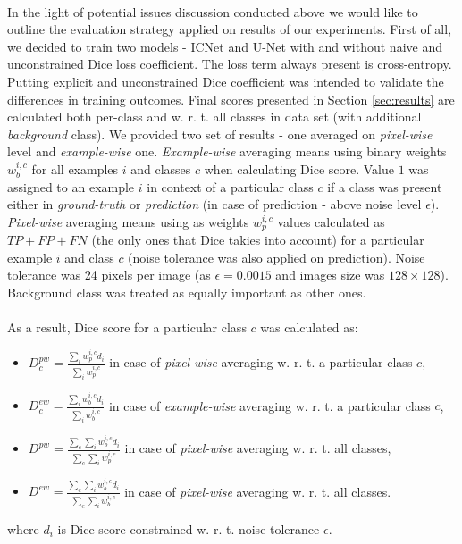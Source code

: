 \documentclass{article}
\begin{document}
\paragraph{}
In the light of potential issues discussion conducted above we would like to outline the evaluation strategy applied on results of our experiments. First of all, we decided to train two models - ICNet \cite{icnet} and U-Net \cite{unet} with and without naive and unconstrained Dice loss coefficient. The loss term always present is cross-entropy. Putting explicit and unconstrained Dice coefficient was intended to validate the differences in training outcomes. Final scores presented in Section \ref{sec:results} are calculated both per-class and w. r. t. all classes in data set (with additional \textit{background} class). We provided two set of results - one averaged on \textit{pixel-wise} level and \textit{example-wise} one. \textit{Example-wise} averaging means using binary weights $w_b^{i, c}$ for all examples $i$ and classes $c$ when calculating Dice score. Value $1$ was assigned to an example $i$ in context of a particular class $c$ if a class was present either in \textit{ground-truth} or \textit{prediction} (in case of prediction - above noise level $\epsilon$). \textit{Pixel-wise} averaging means using as weights $w_p^{i, c}$ values calculated as $TP + FP + FN$ (the only ones that Dice takies into account) for a particular example $i$ and class $c$ (noise tolerance was also applied on prediction). Noise tolerance was 24 pixels per image (as $\epsilon = 0.0015$ and images size was $128 \times 128$). Background class was treated as equally important as other ones.
\paragraph{}
As a result, Dice score for a particular class $c$ was calculated as:
\begin{itemize}
    \item $D^{pw}_{c} = \frac{\sum_i w_p^{i, c}d_i}{\sum_i w_p^{i, c}}$ in case of \textit{pixel-wise} averaging w. r. t. a particular class $c$,
    \item $D^{ew}_{c} = \frac{\sum_i w_b^{i, c}d_i}{\sum_i w_b^{i, c}}$ in case of \textit{example-wise} averaging w. r. t. a particular class $c$,
    \item $D^{pw} = \frac{\sum_{c}\sum_i w_p^{i, c}d_i}{\sum_{c}\sum_i w_p^{i, c}}$ in case of \textit{pixel-wise} averaging w. r. t. all classes,
    \item $D^{ew} = \frac{\sum_{c}\sum_i w_b^{i, c}d_i}{\sum_{c}\sum_i w_b^{i, c}}$ in case of \textit{pixel-wise} averaging w. r. t. all classes.
\end{itemize}
where $d_i$ is Dice score constrained w. r. t. noise tolerance $\epsilon$. 
\end{document}

